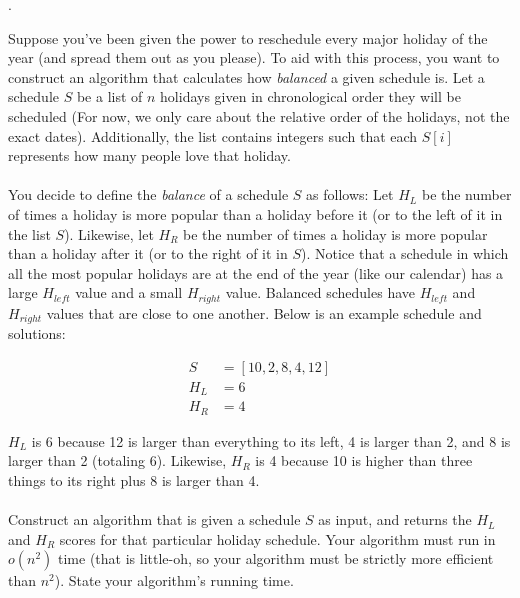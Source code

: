 \documentclass[12pt]{article}
\newcounter{quesnum}
\newcommand{\question}[2][??]{
\begin{list}{\labelitemi}{\leftmargin=2em}
\item [\arabic{quesnum}.] {} {#2}
\end{list}
\addtocounter{quesnum}{1}
}
\begin{document}
\question[3]{
Suppose you've been given the power to reschedule every major holiday of the year (and spread them out as you please). To aid with this process, you want to construct an algorithm that calculates how \emph{balanced} a given schedule is. Let a schedule $S$ be a list of $n$ holidays given in chronological order they will be scheduled (For now, we only care about the relative order of the holidays, not the exact dates). Additionally, the list contains integers such that each $S[i]$ represents how many people love that holiday.\\
\\
You decide to define the \emph{balance} of a schedule $S$ as follows: Let $H_{L}$ be the number of times a holiday is more popular than a holiday before it (or to the left of it in the list $S$). Likewise, let $H_{R}$ be the number of times a holiday is more popular than a holiday after it (or to the right of it in $S$). Notice that a schedule in which all the most popular holidays are at the end of the year (like our calendar) has a large $H_{left}$ value and a small $H_{right}$ value. Balanced schedules have $H_{left}$ and $H_{right}$ values that are close to one another. Below is an example schedule and solutions:

\begin{align*}
S &= [10, 2, 8, 4, 12]\\
H_L &= 6\\
H_R &= 4
\end{align*}

$H_L$ is 6 because 12 is larger than everything to its left, 4 is larger than 2, and 8 is larger than 2 (totaling 6). Likewise, $H_R$ is 4 because 10 is higher than three things to its right plus 8 is larger than 4.\\
\\
Construct an algorithm that is given a schedule $S$ as input, and returns the $H_{L}$ and $H_{R}$ scores for that particular holiday schedule. Your algorithm must run in $o(n^2)$ time (that is little-oh, so your algorithm must be strictly more efficient than $n^2$). State your algorithm's running time.
}



\end{document}
